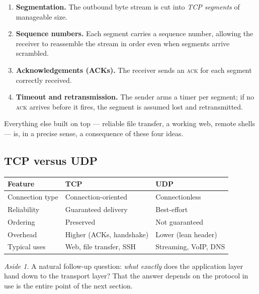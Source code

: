 \documentclass[11pt,a4paper]{article}
\theoremstyle{definition}
\theoremstyle{remark}
\newtheorem*{aside}{Aside}
\begin{document}
\begin{enumerate}
    \item \textbf{Segmentation.} The outbound byte stream is cut into \emph{TCP segments} of manageable size.
    \item \textbf{Sequence numbers.} Each segment carries a sequence number, allowing the receiver to reassemble the stream in order even when segments arrive scrambled.
    \item \textbf{Acknowledgements (ACKs).} The receiver sends an \textsc{ack} for each segment correctly received.
    \item \textbf{Timeout and retransmission.} The sender arms a timer per segment; if no \textsc{ack} arrives before it fires, the segment is assumed lost and retransmitted.
\end{enumerate}

Everything else built on top --- reliable file transfer, a working web, remote shells --- is, in a precise sense, a consequence of these four ideas.

\subsection{TCP versus UDP}

\begin{center}
\renewcommand{\arraystretch}{1.3}
\begin{tabular}{@{}l l l@{}}
\toprule
\textbf{Feature}   & \textbf{TCP}                  & \textbf{UDP} \\
\midrule
Connection type    & Connection-oriented           & Connectionless \\
Reliability        & Guaranteed delivery           & Best-effort \\
Ordering           & Preserved                     & Not guaranteed \\
Overhead           & Higher (ACKs, handshake)      & Lower (lean header) \\
Typical uses       & Web, file transfer, SSH       & Streaming, VoIP, DNS \\
\bottomrule
\end{tabular}
\end{center}

\begin{aside}
A natural follow-up question: \emph{what exactly} does the application layer hand down to the transport layer? That the answer depends on the protocol in use is the entire point of the next section.
\end{aside}
\end{document}
